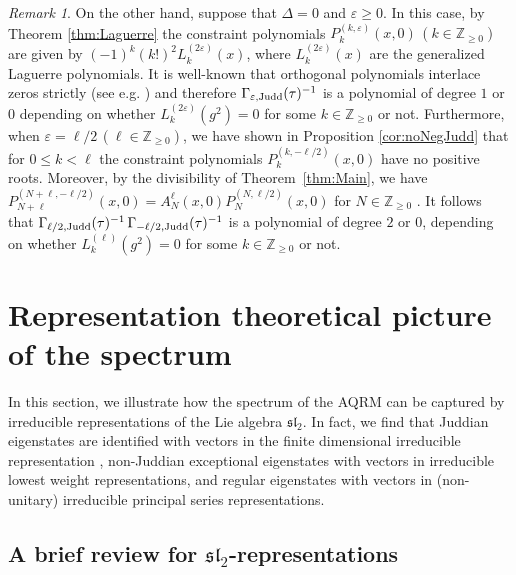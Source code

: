 \documentclass[11pt]{article}
\numberwithin{equation}{section}
\newcommand{\Z}{\mathbb{Z}} %
\newcommand{\e}{\varepsilon}
\newcommand{\cp}[2]{P^{(#1)}_{#2}} %
\theoremstyle{plain}
\theoremstyle{definition}
\theoremstyle{remark}
\newtheorem{rem}{Remark}[section]
\begin{document}
\begin{rem}
  On the other hand, suppose that \(\Delta = 0 \) and \(\e \geq  0\). In this case, by Theorem \ref{thm:Laguerre} the constraint polynomials
  \(\cp{k,\e}{k}(x,0) \, (k \in \Z_{\geq 0})\) are given by \( (-1)^k (k!)^2 L^{(2\e)}_k (x)\), where  \(L^{(2\e)}_k (x)\) are the generalized Laguerre
  polynomials. It is well-known that orthogonal polynomials interlace zeros strictly (see e.g. \cite{AAR1999,C1978}) and therefore
  \(\Gamma_{{\e}, \rm{Judd}} (\tau)^{-1}\) is a polynomial of degree \(1\) or \(0\) depending on whether \( L^{(2\e)}_k (g^2) = 0\) for some
  \(k \in \Z_{\geq 0} \) or not. Furthermore, when \(\e = \ell/2 \, (\ell \in \Z_{\geq 0})\), we have shown in Proposition \ref{cor:noNegJudd} that
  for \(0 \leq k < \ell\) the constraint polynomials \(\cp{k,-\ell/2}{k}(x,0)\) have no positive roots. Moreover, by the divisibility
  of Theorem~\ref{thm:Main}, we have \(\cp{N+\ell,-\ell/2}{N+\ell}(x,0) = A_N^{\ell}(x,0)\cp{N,\ell/2}{N}(x,0)\) for \( N \in \Z_{\geq 0} \) . It follows that
  \(  \Gamma_{{\ell/2}, \rm{Judd}} (\tau)^{-1} \, \Gamma_{{-\ell/2}, \rm{Judd}} (\tau)^{-1}\) is a polynomial of degree \( 2\) or \(0\), depending on whether
  \( L^{(\ell)}_k (g^2)=0\) for some \(k \in \Z_{\geq 0} \) or not.
\end{rem}

\section{Representation theoretical picture of the spectrum} \label{sec:repr-theor-pict}

In this section, we illustrate how the spectrum of the AQRM can be captured by irreducible representations of the Lie algebra $\mathfrak{sl}_2$. In fact, we find that Juddian eigenstates are identified with vectors in the finite dimensional irreducible representation \cite{W2016JPA}, non-Juddian exceptional eigenstates with vectors in irreducible lowest weight representations, and regular eigenstates with vectors in (non-unitary) irreducible principal series representations. 


\subsection{A brief review for \texorpdfstring{$\mathfrak{sl}_2$}{sl2}-representations}
\end{document}
